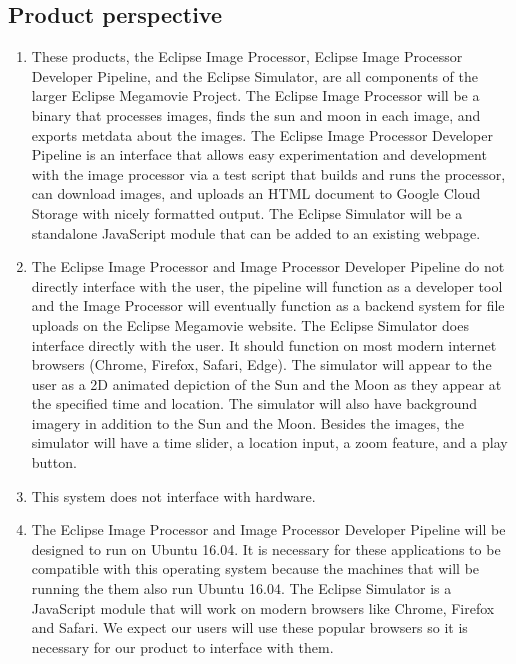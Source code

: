 \documentclass[10pt, onecolumn, draftclsnofoot, letterpaper, compsoc]{IEEEtran}
\begin{document}
\subsection{Product perspective}
	\begin{enumerate}
		\item These products, the Eclipse Image Processor, Eclipse Image
		Processor Developer Pipeline, and the Eclipse Simulator, are all components of
		the larger Eclipse Megamovie Project. The Eclipse Image Processor will be
		a binary that processes images, finds the sun and moon in each image, and
        exports metdata about the images. The Eclipse Image Processor Developer
        Pipeline is an interface that allows easy experimentation and development
        with the image processor via a test script that builds and runs the processor, can
        download images, and uploads an HTML document to Google Cloud Storage
        with nicely formatted output. The Eclipse Simulator will be a standalone
        JavaScript module that can be added to an existing webpage.

		\item The Eclipse Image Processor and Image Processor Developer Pipeline
		do not directly interface with the user, the pipeline will function as a
        developer tool and the Image Processor will eventually function as a backend
        system for file uploads on the Eclipse Megamovie website.
		The Eclipse Simulator does interface
		directly with the user. It should function on most modern
		internet browsers (Chrome, Firefox, Safari, Edge). The simulator
		will appear to the user as a 2D animated depiction of the
		Sun and the Moon as they appear at the specified time and
		location. The simulator will also have background imagery in
		addition to the Sun and the Moon. Besides the images, the
		simulator will have a time slider, a location input, a zoom feature,
        and a play button.

		\item This system does not interface with hardware.

		\item The Eclipse Image Processor and Image Processor Developer Pipeline
		will be designed to run on Ubuntu 16.04. It is necessary for these
		applications to be compatible with this operating system because
		the machines that will be running the them also run Ubuntu 16.04. The Eclipse
		Simulator is a JavaScript module that will work on modern
		browsers like Chrome, Firefox and Safari. We expect our
		users will use these popular browsers so it is necessary
		for our product to interface with them.
	\end{enumerate}
\end{document}
